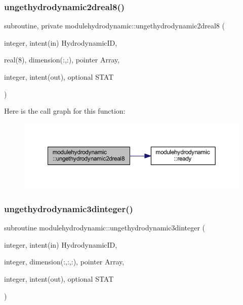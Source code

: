 \subsubsection{\texorpdfstring{ungethydrodynamic2dreal8()}{ungethydrodynamic2dreal8()}}
{\footnotesize\ttfamily subroutine, private modulehydrodynamic\+::ungethydrodynamic2dreal8 (\begin{DoxyParamCaption}\item[{integer, intent(in)}]{Hydrodynamic\+ID,  }\item[{real(8), dimension(\+:,\+:), pointer}]{Array,  }\item[{integer, intent(out), optional}]{S\+T\+AT }\end{DoxyParamCaption})\hspace{0.3cm}{\ttfamily [private]}}

Here is the call graph for this function\+:\nopagebreak
\begin{figure}[H]
\begin{center}
\leavevmode
\includegraphics[width=350pt]{namespacemodulehydrodynamic_a38b09b823496f823b15a0b020595a9c1_cgraph}
\end{center}
\end{figure}
\mbox{\label{namespacemodulehydrodynamic_aeb1abec5f84ff629b6a72c2c9955c7af}} 
\subsubsection{\texorpdfstring{ungethydrodynamic3dinteger()}{ungethydrodynamic3dinteger()}}
{\footnotesize\ttfamily subroutine modulehydrodynamic\+::ungethydrodynamic3dinteger (\begin{DoxyParamCaption}\item[{integer, intent(in)}]{Hydrodynamic\+ID,  }\item[{integer, dimension(\+:,\+:,\+:), pointer}]{Array,  }\item[{integer, intent(out), optional}]{S\+T\+AT }\end{DoxyParamCaption})\hspace{0.3cm}{\ttfamily [private]}}

